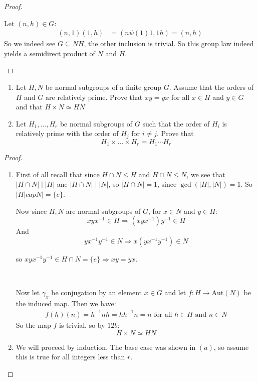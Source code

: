 \begin{exercise}
\begin{proof}
\begin{enumerate}[label = (\alph*)]
                Let $(n,h)\in G$:\begin{align*}
                    (n,1)(1,h) &= (n\psi(1)1, 1h) = (n,h)
                \end{align*}
                So we indeed see $G\subseteq NH$, the other inclusion is trivial. So this group law indeed yields a semidirect product of $N$ and $H$.
            \end{enumerate}    
    \end{proof}
\end{exercise}

\begin{exercise}
    \begin{enumerate}[label = (\alph*)]
        \item Let $H,N$ be normal subgroups of a finite group $G$. Assume that the orders of $H$ and $G$ are relatively prime. Prove that $xy=yx$ for all $x\in H$ and $y\in G$ and that $H\times N\simeq HN$
        \item Let $H_1,\ldots,H_r$ be normal subgroups of $G$ such that the order of $H_i$ is relatively prime with the order of $H_j$ for $i\neq j$. Prove that \[H_1\times \ldots \times H_r = H_1\cdots H_r\]
    \end{enumerate}
    \begin{proof}
        \begin{enumerate}[label = (\alph*)]
            \item First of all recall that since $H\cap N\leq H$ and $H\cap N\leq N$, we see that $|H\cap N| \mid |H|$ ane $|H\cap N|\mid |N|$, so $|H\cap N| = 1$, since $\gcd(|H|,|N|) = 1$. So $|H|cap N| = \{e\}$.
            
            Now since $H,N$ are normal subgroups of $G$, for $x\in N$ and $y\in H$:\begin{equation*}
                xyx^{-1}\in H \Rightarrow (xyx^{-1})y^{-1}\in H
            \end{equation*}
            And \begin{equation*}
                yx^{-1}y^{-1}\in N \Rightarrow x(yx^{-1}y^{-1})\in N
            \end{equation*}

            so $xyx^{-1}y^{-1}\in H\cap N = \{e\} \Rightarrow xy = yx$.

            \

            Now let $\gamma_x$ be conjugation by an element $x\in G$ and let $f\colon H\rightarrow \text{Aut}(N)$ be the induced map. Then we have:\begin{align*}
                f(h)(n) = h^{-1}nh = hh^{-1}n = n \text{ for all }h\in H \text{ and }n\in N
            \end{align*}
            So the map $f$ is trivial, so by $12b$:\[H\times N \simeq HN\]
            \item  We will proceed by induction. The base case was shown in $(a)$, so assume this is true for all integers less than $r$.
            

\end{enumerate}
\end{proof}
\end{exercise}
